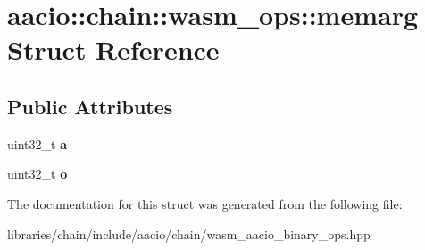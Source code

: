 \hypertarget{structaacio_1_1chain_1_1wasm__ops_1_1memarg}{}\section{aacio\+:\+:chain\+:\+:wasm\+\_\+ops\+:\+:memarg Struct Reference}
\label{structaacio_1_1chain_1_1wasm__ops_1_1memarg}
\subsection*{Public Attributes}
\begin{DoxyCompactItemize}
\item 
\mbox{\label{structaacio_1_1chain_1_1wasm__ops_1_1memarg_ad0b4232d61aad20dbbfd798318e5881c}} 
uint32\+\_\+t {\bfseries a}
\item 
\mbox{\label{structaacio_1_1chain_1_1wasm__ops_1_1memarg_aa04eea1b52d4cf9ba3b323769630c3e7}} 
uint32\+\_\+t {\bfseries o}
\end{DoxyCompactItemize}


The documentation for this struct was generated from the following file\+:\begin{DoxyCompactItemize}
\item 
libraries/chain/include/aacio/chain/wasm\+\_\+aacio\+\_\+binary\+\_\+ops.\+hpp\end{DoxyCompactItemize}
